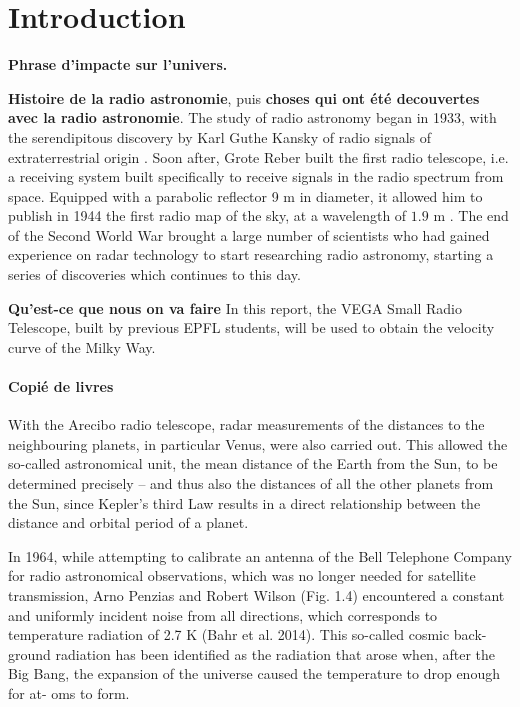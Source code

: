 \section{Introduction}
\textbf{Phrase d'impacte sur l'univers.}

\textbf{Histoire de la radio astronomie}, puis \textbf{choses qui ont été decouvertes avec la radio astronomie}.
The study of radio astronomy began in 1933, with the serendipitous discovery by Karl Guthe Kansky of radio signals of extraterrestrial origin \cite{condon_essential_2016}. 
Soon after, Grote Reber built the first radio telescope, i.e. a receiving system built specifically to receive signals in the radio spectrum from space. Equipped with a parabolic reflector 9 m in diameter, it allowed him to publish in 1944 the first radio map of the sky, at a wavelength of $1.9$ m \cite{lauterbach_radio_2022}.
The end of the Second World War brought a large number of scientists who had gained experience on radar technology to start researching radio astronomy, starting a series of discoveries which continues to this day.

\textbf{Qu'est-ce que nous on va faire}
In this report, the VEGA Small Radio Telescope, built by previous EPFL students, will be used to obtain the velocity curve of the Milky Way.

\paragraph{Copié de livres}
With the Arecibo radio telescope, radar measurements of the distances to the
neighbouring planets, in particular Venus, were also carried out. This allowed the
so-called astronomical unit, the mean distance of the Earth from the Sun, to be
determined precisely – and thus also the distances of all the other planets from the
Sun, since Kepler’s third Law results in a direct relationship between the distance
and orbital period of a planet.

In 1964, while attempting to calibrate an antenna of the Bell Telephone
Company for radio astronomical observations, which was no longer needed for
satellite transmission, Arno Penzias and Robert Wilson (Fig. 1.4) encountered a
constant and uniformly incident noise from all directions, which corresponds to
temperature radiation of 2.7 K (Bahr et al. 2014). This so-called cosmic back-
ground radiation has been identified as the radiation that arose when, after the Big
Bang, the expansion of the universe caused the temperature to drop enough for at-
oms to form.


